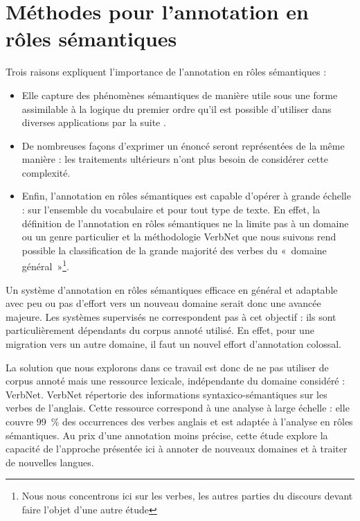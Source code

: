 \documentclass[oneside,parskip]{scrbook}
\begin{document}




\part{Méthodes pour l'annotation en rôles sémantiques}
\label{part:methodes}

Trois raisons expliquent l'importance de l'annotation en rôles sémantiques :

\begin{itemize}

    \item Elle capture des phénomènes sémantiques de manière utile sous une
        forme assimilable à la logique du premier ordre qu'il est possible
        d'utiliser dans diverses applications par la suite
        \citep{osman2012improved,xie2013semantic}.

    \item De nombreuses façons d'exprimer un énoncé seront représentées de la
        même manière : les traitements ultérieurs n'ont plus besoin de
        considérer cette complexité.

    \item Enfin, l'annotation en rôles sémantiques est capable d'opérer à
        grande échelle : sur l'ensemble du vocabulaire et pour tout type de
        texte.  En effet, la définition de l'annotation en rôles sémantiques ne
        la limite pas à un domaine ou un genre particulier et la méthodologie
        VerbNet que nous suivons rend possible la classification de la grande
        majorité des verbes du «~domaine général~»\footnote{Nous nous
            concentrons ici sur les verbes, les autres parties du discours
            devant faire l'objet d'une autre étude}.

\end{itemize}

Un système d'annotation en rôles sémantiques efficace en général et adaptable
avec peu ou pas d'effort vers un nouveau domaine serait donc une avancée
majeure. Les systèmes supervisés ne correspondent pas à cet objectif : ils sont
particulièrement dépendants du corpus annoté utilisé. En effet, pour une
migration vers un autre domaine, il faut un nouvel effort d'annotation
colossal.

La solution que nous explorons dans ce travail est donc de ne pas utiliser de
corpus annoté mais une ressource lexicale, indépendante du domaine considéré :
VerbNet. VerbNet répertorie des informations syntaxico-sémantiques sur les
verbes de l'anglais.  Cette ressource correspond à une analyse à large échelle
: elle couvre 99~\% des occurrences des verbes anglais \citep[partie 1,
p~.53]{palmer2013semantic} et est adaptée à l'analyse en rôles sémantiques.
Au prix d'une annotation moins précise, cette étude explore la capacité de
l'approche présentée ici à annoter de nouveaux domaines et à traiter de
nouvelles langues.
\end{document}
